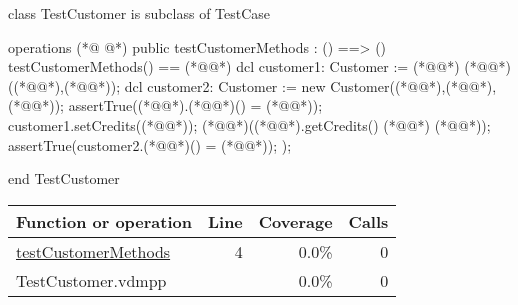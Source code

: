 \begin{vdmpp}[breaklines=true]
class TestCustomer is subclass of TestCase

operations
(*@
\label{testCustomerMethods:4}
@*)
 public testCustomerMethods : () ==> ()
 testCustomerMethods() == (*@\vdmnotcovered{(}@*)
  dcl customer1: Customer := (*@@*) (*@@*)((*@@*),(*@@*));
  dcl customer2: Customer := new Customer((*@@*),(*@@*),(*@@*));  
  assertTrue((*@@*).(*@@*)() = (*@@*));
  customer1.setCredits((*@@*));
  (*@@*)((*@@*).getCredits() (*@\vdmnotcovered{=}@*) (*@@*));
  assertTrue(customer2.(*@@*)() = (*@@*));  
 );

end TestCustomer
\end{vdmpp}
\bigskip
\begin{longtable}{|l|r|r|r|}
\hline
Function or operation & Line & Coverage & Calls \\
\hline
\hline
\hyperref[testCustomerMethods:4]{testCustomerMethods} & 4&0.0\% & 0 \\
\hline
\hline
TestCustomer.vdmpp & & 0.0\% & 0 \\
\hline
\end{longtable}

